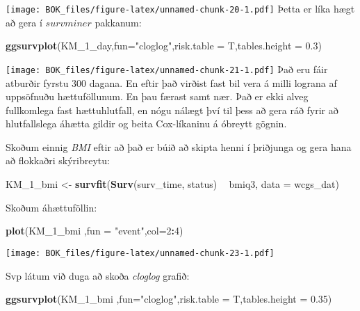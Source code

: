 \documentclass[
]{book}
\newenvironment{Shaded}{\begin{snugshade}}{\end{snugshade}}
\newcommand{\DataTypeTok}[1]{\textcolor[rgb]{0.13,0.29,0.53}{#1}}
\newcommand{\DecValTok}[1]{\textcolor[rgb]{0.00,0.00,0.81}{#1}}
\newcommand{\FloatTok}[1]{\textcolor[rgb]{0.00,0.00,0.81}{#1}}
\newcommand{\KeywordTok}[1]{\textcolor[rgb]{0.13,0.29,0.53}{\textbf{#1}}}
\newcommand{\NormalTok}[1]{#1}
\newcommand{\OperatorTok}[1]{\textcolor[rgb]{0.81,0.36,0.00}{\textbf{#1}}}
\newcommand{\StringTok}[1]{\textcolor[rgb]{0.31,0.60,0.02}{#1}}
\begin{document}
\texttt{[image: BOK\_files/figure-latex/unnamed-chunk-20-1.pdf]}
Þetta er líka hægt að gera í \(survminer\) pakkanum:

\begin{Shaded}
\begin{Highlighting}[]
\KeywordTok{ggsurvplot}\NormalTok{(KM_}\DecValTok{1}\NormalTok{_day,}\DataTypeTok{fun=}\StringTok{"cloglog"}\NormalTok{,}\DataTypeTok{risk.table =}\NormalTok{ T,}\DataTypeTok{tables.height =} \FloatTok{0.3}\NormalTok{)}
\end{Highlighting}
\end{Shaded}

\texttt{[image: BOK\_files/figure-latex/unnamed-chunk-21-1.pdf]}
Það eru fáir atburðir fyrstu 300 dagana. En eftir það virðist fast bil vera á milli lograna af uppsöfnuðu hættuföllunum. En þau færast samt nær. Það er ekki alveg fullkomlega fast hættuhlutfall, en nógu nálægt því til þess að gera ráð fyrir að hlutfallslega áhætta gildir og beita Cox-líkaninu á óbreytt gögnin.

Skoðum einnig \emph{BMI} eftir að það er búið að skipta henni í þriðjunga og gera hana að flokkaðri skýribreytu:

\begin{Shaded}
\begin{Highlighting}[]
\NormalTok{KM_}\DecValTok{1}\NormalTok{_bmi <-}\StringTok{ }\KeywordTok{survfit}\NormalTok{(}\KeywordTok{Surv}\NormalTok{(surv_time, status) }\OperatorTok{~}\StringTok{ }\NormalTok{bmiq3, }\DataTypeTok{data =}\NormalTok{ wcgs_dat)}
\end{Highlighting}
\end{Shaded}

Skoðum áhættuföllin:

\begin{Shaded}
\begin{Highlighting}[]
\KeywordTok{plot}\NormalTok{(KM_}\DecValTok{1}\NormalTok{_bmi ,}\DataTypeTok{fun =} \StringTok{"event"}\NormalTok{,}\DataTypeTok{col=}\DecValTok{2}\OperatorTok{:}\DecValTok{4}\NormalTok{)}
\end{Highlighting}
\end{Shaded}

\texttt{[image: BOK\_files/figure-latex/unnamed-chunk-23-1.pdf]}

Svp látum við duga að skoða \emph{cloglog} grafið:

\begin{Shaded}
\begin{Highlighting}[]
\KeywordTok{ggsurvplot}\NormalTok{(KM_}\DecValTok{1}\NormalTok{_bmi ,}\DataTypeTok{fun=}\StringTok{"cloglog"}\NormalTok{,}\DataTypeTok{risk.table =}\NormalTok{ T,}\DataTypeTok{tables.height =} \FloatTok{0.35}\NormalTok{)}
\end{Highlighting}
\end{Shaded}
\end{document}
